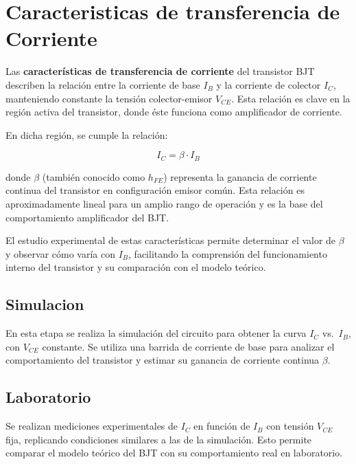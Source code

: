 \chapter{Caracteristicas de transferencia de Corriente}
    Las \textbf{características de transferencia de corriente} del transistor BJT describen la relación entre la corriente de base $I_B$ y la corriente de colector $I_C$, manteniendo constante la tensión colector-emisor $V_{CE}$. Esta relación es clave en la región activa del transistor, donde éste funciona como amplificador de corriente.
    
    En dicha región, se cumple la relación:
    
    \[
    I_C = \beta \cdot I_B
    \]
    
    donde $\beta$ (también conocido como $h_{FE}$) representa la ganancia de corriente continua del transistor en configuración emisor común. Esta relación es aproximadamente lineal para un amplio rango de operación y es la base del comportamiento amplificador del BJT.
    
    El estudio experimental de estas características permite determinar el valor de $\beta$ y observar cómo varía con $I_B$, facilitando la comprensión del funcionamiento interno del transistor y su comparación con el modelo teórico.

\newpage

  \section{Simulacion}

  En esta etapa se realiza la simulación del circuito para obtener la curva $I_C$ vs.\ $I_B$, con $V_{CE}$ constante. Se utiliza una barrida de corriente de base para analizar el comportamiento del transistor y estimar su ganancia de corriente continua $\beta$.


\newpage

  \section{Laboratorio}

  Se realizan mediciones experimentales de $I_C$ en función de $I_B$ con tensión $V_{CE}$ fija, replicando condiciones similares a las de la simulación. Esto permite comparar el modelo teórico del BJT con su comportamiento real en laboratorio.

